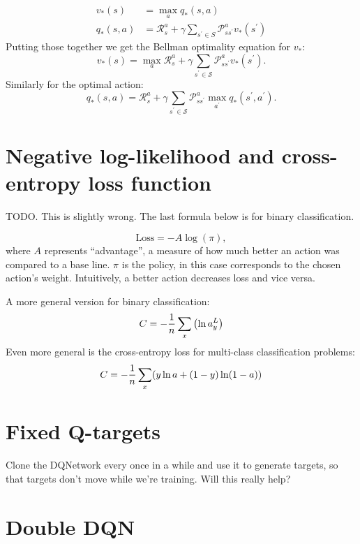 \documentclass[10pt]{article}
\theoremstyle{plain}
\theoremstyle{definition}
\theoremstyle{remark}
\renewcommand\frac[2]{\genfrac{}{}{0.5pt}{}{#1}{#2}}
\newcommand{\0}{\varnothing}
\newcommand{\<}{\langle}
\renewcommand{\>}{\rangle}
\begin{document}
\begin{align*}
v _ { * } ( s ) &= \max _ { a } q _ { * } ( s , a ) \\
q _ { * } ( s , a ) &= \mathcal { R } _ { s } ^ { a } + \gamma \sum _ { s ^ { \prime } \in S } \mathcal { P } _ { s s ^ { ' } } ^ { a } v _ { * } \left( s ^ { \prime } \right)
\end{align*}
Putting those together we get the Bellman optimality equation for \( v_*: \)
\[
v _ { * } ( s ) = \max _ { a } \mathcal { R } _ { s } ^ { a } + \gamma \sum _ { s ^ { \prime } \in \mathcal { S } } \mathcal { P } _ { s s ^ { \prime } } ^ { a } v _ { * } \left( s ^ { \prime } \right).
\]
Similarly for the optimal action:
\[
q _ { * } ( s , a ) = \mathcal { R } _ { s } ^ { a } + \gamma \sum _ { s ^ { \prime } \in \mathcal { S } } \mathcal { P } _ { s s ^ { \prime } } ^ { a } \max _ { a ^ { \prime } } q _ { * } \left( s ^ { \prime } , a ^ { \prime } \right).
\]

\section{Negative log-likelihood and cross-entropy loss function}

TODO. This is slightly wrong. The last formula below is for binary classification.

\[
\text{Loss} = - A \log(\pi),
\]
where \( A \) represents ``advantage'', a measure of how much better an action was
compared to a base line. \( \pi \) is the policy, in this case corresponds to
the chosen action's weight. Intuitively, a better action decreases loss and vice
versa.

A more general version for binary classification:
\[
C = - \frac { 1 } { n } \sum _ { x } \left( \ln a _ { y } ^ { L } \right)
\]
Even more general is the cross-entropy loss for multi-class classification problems:
\[
C = - \frac { 1 } { n } \sum _ { x } ( y \ln a + ( 1 - y ) \ln ( 1 - a ) )
\]

\section{Fixed Q-targets}

Clone the DQNetwork every once in a while and use it to generate targets, so that targets don't move while we're training. Will this really help?

\section{Double DQN}
\end{document}
